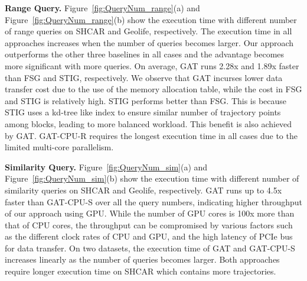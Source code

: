 \documentclass[10pt,conference,letterpaper]{IEEEtran}
\newcommand{\frname}{GAT\xspace }
\begin{document}
\vspace{0.1cm}\textbf{Range Query.}
Figure~\ref{fig:QueryNum_range}(a) and Figure~\ref{fig:QueryNum_range}(b) show the execution time with different number of range queries on SHCAR and Geolife, respectively. The execution time in all approaches increases when the number of queries becomes larger.
Our approach outperforms the other three baselines in all cases and the advantage becomes more significant with more queries.
On average, \frname runs 2.28x and 1.89x faster than FSG and STIG, respectively. We observe that GAT incurses lower data transfer cost due to the use of the memory allocation table, while the cost in FSG and STIG is relatively high.
STIG performs better than FSG. This is because STIG uses a kd-tree like index to ensure similar number of trajectory points among blocks, leading to more balanced workload. This benefit is also achieved by \frname. \frname-CPU-R requires the longest execution time in all cases due to the limited multi-core parallelism.



\vspace{0.1cm}\textbf{Similarity Query.}
Figure~\ref{fig:QueryNum_sim}(a) and Figure~\ref{fig:QueryNum_sim}(b) show the execution time with different number of similarity queries on SHCAR and Geolife, respectively. \frname runs up to 4.5x faster than \frname-CPU-S over all the query numbers, indicating higher throughput of our approach using GPU. While the number of GPU cores is 100x more than that of CPU cores, the throughput can be compromised by various factors such as the different clock rates of CPU and GPU, and the high latency of PCIe bus for data transfer. 
On two datasets, the execution time of \frname and \frname-CPU-S increases linearly as the number of queries becomes larger. Both approaches require longer execution time on SHCAR which contains more trajectories.
\end{document}
